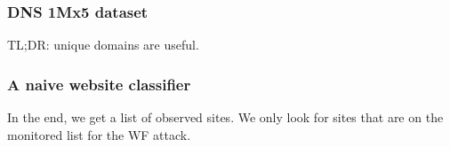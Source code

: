 

\subsubsection{DNS 1Mx5 dataset}
TL;DR: unique domains are useful.

\subsubsection{A naive website classifier}
In the end, we get a list of observed sites. We only look for sites that are
on the monitored list for the WF attack.
